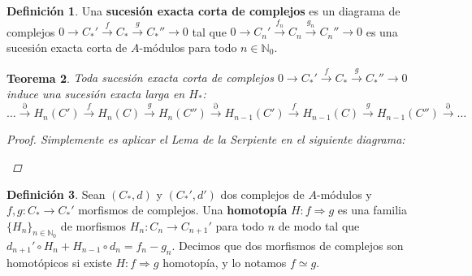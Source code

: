 \documentclass[12pt]{book}
\newtheorem{teo}{Teorema}[section]
\theoremstyle{definition}
\newtheorem{defn}[teo]{Definición}
\newcommand{\NN}{\mathbb{N}}
\DeclareMathOperator{\im}{im}
\begin{document}
\begin{defn}
Una \textbf{sucesión exacta corta de complejos} es un diagrama de complejos $0\longrightarrow C_*'\stackrel{f}{\longrightarrow}C_*\stackrel{g}{\longrightarrow}C_*''\longrightarrow 0$ tal que $0\longrightarrow C_n'\stackrel{f_n}{\longrightarrow} C_n\stackrel{g_n}{\longrightarrow} C_n''\longrightarrow 0$ es una sucesión exacta corta de $A$-módulos para todo $n\in\NN_0$.
\end{defn}

\begin{teo}
Toda sucesión exacta corta de complejos $0\longrightarrow C_*'\stackrel{f}{\longrightarrow}C_*\stackrel{g}{\longrightarrow} C_*''\longrightarrow 0$ induce una sucesión exacta larga en $H_*$: $$\ldots \stackrel{\partial}{\longrightarrow} H_n(C')\stackrel{f}{\longrightarrow}H_n(C)\stackrel{g}{\longrightarrow} H_n(C'') \stackrel{\partial}{\longrightarrow} H_{n-1}(C')\stackrel{f}{\longrightarrow} H_{n-1}(C)\stackrel{g}{\longrightarrow} H_{n-1}(C'')\stackrel{\partial}{\longrightarrow}\ldots $$
\begin{proof}
Simplemente es aplicar el Lema de la Serpiente en el siguiente diagrama:

\begin{center}\end{center}

\end{proof}
\end{teo}

\begin{defn}
Sean $(C_*,d)$ y $(C_*',d')$ dos complejos de $A$-módulos y $f,g:C_*\to C_*'$ morfismos de complejos. Una \textbf{homotopía} $H:f\Longrightarrow g$ es una familia $\{H_n\}_{n\in\NN_0}$ de morfismos $H_n:C_n\to C_{n+1}'$ para todo $n$ de modo tal que $d_{n+1}'\circ H_n + H_{n-1}\circ d_n = f_n-g_n$. Decimos que dos morfismos de complejos son homotópicos si existe $H:f\Longrightarrow g$ homotopía, y lo notamos $f\simeq g$.
\end{defn}
\end{document}
